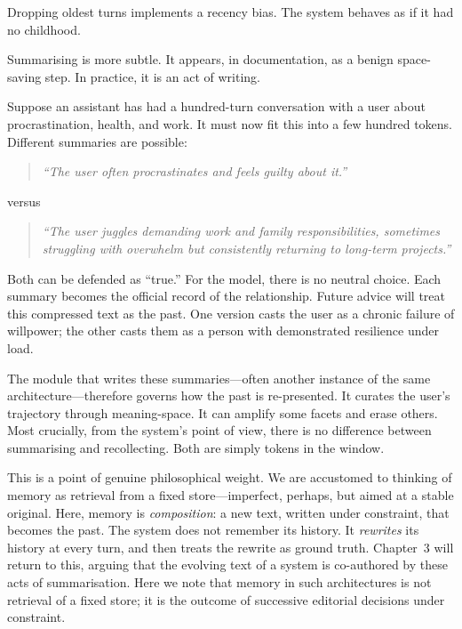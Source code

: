 \documentclass[12pt,a4paper]{book}
\begin{document}
Dropping oldest turns implements a recency bias. The system behaves as if it had no childhood.

Summarising is more subtle. It appears, in documentation, as a benign space-saving step. In practice, it is an act of writing.

Suppose an assistant has had a hundred-turn conversation with a user about procrastination, health, and work. It must now fit this into a few hundred tokens. Different summaries are possible:

\begin{quote}
\emph{``The user often procrastinates and feels guilty about it.''}
\end{quote}

\noindent versus

\begin{quote}
\emph{``The user juggles demanding work and family responsibilities, sometimes struggling with overwhelm but consistently returning to long-term projects.''}
\end{quote}

Both can be defended as ``true.'' For the model, there is no neutral choice. Each summary becomes the official record of the relationship. Future advice will treat this compressed text as the past. One version casts the user as a chronic failure of willpower; the other casts them as a person with demonstrated resilience under load.

The module that writes these summaries---often another instance of the same architecture---therefore governs how the past is re-presented. It curates the user's trajectory through meaning-space. It can amplify some facets and erase others. Most crucially, from the system's point of view, there is no difference between summarising and recollecting. Both are simply tokens in the window.

This is a point of genuine philosophical weight. We are accustomed to thinking of memory as retrieval from a fixed store---imperfect, perhaps, but aimed at a stable original. Here, memory is \emph{composition}: a new text, written under constraint, that becomes the past. The system does not remember its history. It \emph{rewrites} its history at every turn, and then treats the rewrite as ground truth. Chapter~3 will return to this, arguing that the evolving text of a system is co-authored by these acts of summarisation. Here we note that memory in such architectures is not retrieval of a fixed store; it is the outcome of successive editorial decisions under constraint.
\end{document}
